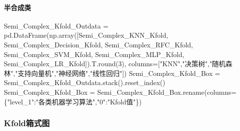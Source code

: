 \documentclass[
]{article}
\newenvironment{Shaded}{}{}
\newcommand{\BuiltInTok}[1]{#1}
\newcommand{\DecValTok}[1]{\textcolor[rgb]{0.25,0.63,0.44}{#1}}
\newcommand{\NormalTok}[1]{#1}
\newcommand{\OperatorTok}[1]{\textcolor[rgb]{0.40,0.40,0.40}{#1}}
\newcommand{\StringTok}[1]{\textcolor[rgb]{0.25,0.44,0.63}{#1}}
\begin{document}
\hypertarget{header-n335}{%
\paragraph{半合成类}\label{header-n335}}

\begin{Shaded}
\begin{Highlighting}[]
\NormalTok{Semi\_Complex\_Kfold\_Outdata }\OperatorTok{=}\NormalTok{ pd.DataFrame(np.array([Semi\_Complex\_KNN\_Kfold,}
\NormalTok{                                                   Semi\_Complex\_Decision\_Kfold,}
\NormalTok{                                                   Semi\_Complex\_RFC\_Kfold,}
\NormalTok{                                                   Semi\_Complex\_SVM\_Kfold,}
\NormalTok{                                                   Semi\_Complex\_MLP\_Kfold,}
\NormalTok{                                                   Semi\_Complex\_LR\_Kfold]).T.}\BuiltInTok{round}\NormalTok{(}\DecValTok{3}\NormalTok{),}
\NormalTok{                                         columns}\OperatorTok{=}\NormalTok{[}\StringTok{"KNN"}\NormalTok{,}\StringTok{"决策树"}\NormalTok{,}\StringTok{"随机森林"}\NormalTok{,}\StringTok{"支持向量机"}\NormalTok{,}\StringTok{"神经网络"}\NormalTok{,}\StringTok{"线性回归"}\NormalTok{])}
\NormalTok{Semi\_Complex\_Kfold\_Box }\OperatorTok{=}\NormalTok{ Semi\_Complex\_Kfold\_Outdata.stack().reset\_index()}
\NormalTok{Semi\_Complex\_Kfold\_Box }\OperatorTok{=}\NormalTok{ Semi\_Complex\_Kfold\_Box.rename(columns}\OperatorTok{=}\NormalTok{\{}\StringTok{"level\_1"}\NormalTok{:}\StringTok{"各类机器学习算法"}\NormalTok{,}\StringTok{"0"}\NormalTok{:}\StringTok{"Kfold值"}\NormalTok{\})}
\end{Highlighting}
\end{Shaded}

\hypertarget{header-n338}{%
\subsubsection{Kfold箱式图}\label{header-n338}}
\end{document}
